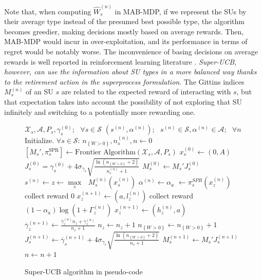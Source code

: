 Note that, when computing $\widehat{W}_s^{(n)}$ in MAB-MDP, if we represent the SUs by their average type instead of the presumed best possible type, the algorithm becomes greedier, making decisions mostly based on average rewards. Then, MAB-MDP would incur in over-exploitation, and its performance in terms of regret would be notably worse. The inconvenience of basing decisions on average rewards is well reported in reinforcement learning literature \cite{ref:Sutton1998}. \textit{Super-UCB, however, can use the information about SU types in a more balanced way thanks to the retirement action in the superprocess formulation}. The Gittins indices $M_s^{(n)}$ of an SU $s$ are related to the expected reward of interacting with $s$, but that expectation takes into account the possibility of not exploring that SU infinitely and switching to a potentially more rewarding one. 

\begin{figure}
\begin{algorithmic}[1]
  \REQUIRE $\mathcal{X}_s,\mathcal{A},P_s,\gamma_s^{(0)};\text{ } \forall s \in \mathcal{S}$
  \ENSURE $(s^{(n)},\alpha^{(n)});\text{ } s^{(n)} \in \mathcal{S}, \alpha^{(n)} \in \mathcal{A};\text{ } \forall n$
  \STATE Initialize. $\forall s \in \mathcal{S}$: 
    \STATE\hspace{\algorithmicindent}$n_{\left\{W>0\right\}}, n_s^{(n)}, n \leftarrow 0$
    \STATE\hspace{\algorithmicindent}$[{M_s'},\pi_s^{\text{SPR}}] \leftarrow \text{Frontier Algorithm}(\mathcal{X}_s,\mathcal{A},P_s)$   
    \STATE\hspace{\algorithmicindent}$x_s^{(0)} \leftarrow (0,A)$
    \STATE\hspace{\algorithmicindent}$J_s^{(0)} = \gamma_{s}^{(0)}+4\sigma_{\gamma_s}\sqrt{\frac{\ln{(n_{\left\{W>0\right\}}+2)}}{n_s^{(n)}+1}}$    
    \STATE\hspace{\algorithmicindent}$M_s^{(0)} \leftarrow M_s'J_s^{(0)}$
  \LOOP
    \STATE $s^{(n)} \leftarrow z \leftarrow \underset{s}\max{\text{ }}M_s^{(n)}(x_s^{(n)})$
    \STATE $\alpha^{(n)} \leftarrow \alpha_a$ $\leftarrow \pi_s^{SPR}(x_z^{(n)})$
      \STATE collect reward  $0$
      \STATE $x_z^{(n+1)} \leftarrow (a,l_z^{(n)})$
    \ELSE
      \STATE collect reward $(1-\alpha_a)\log(1+\Gamma_{z}^{(n)})$
      \STATE $x_{z}^{(n+1)} \leftarrow (h_z^{(n)},a)$ 
      \STATE $\overline{\gamma}_{z}^{(n+1)} \leftarrow \frac{\overline{\gamma}_{z}^{(n)}n_z+\gamma_z^{(n)}}{n_z+1}$  
      \STATE $n_{z} \leftarrow n_{z} + 1$
      \STATE $n_{\left\{W>0\right\}} \leftarrow n_{\left\{W>0\right\}} + 1$
        \STATE $J_s^{(n+1)} \leftarrow \overline{\gamma}_{s}^{(n+1)} + 4\sigma_{\gamma_s} \sqrt{\frac{\ln{(n_{\left\{W>0\right\}}+2)}}{n_s+1}}$
        \STATE $M_s^{(n+1)} \leftarrow M_s'J_s^{(n+1)}$
      \ENDFOR
    \ENDIF
    \STATE $n \leftarrow n+1$
  \ENDLOOP
\end{algorithmic}
\caption{Super-UCB algorithm in pseudo-code}
\label{code:FA_UCB}
\end{figure}

